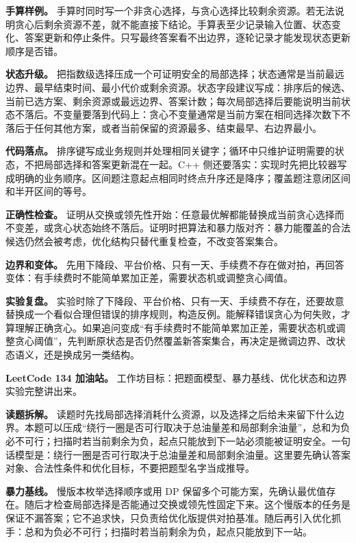 \textbf{手算样例。} 手算时同时写一个非贪心选择，与贪心选择比较剩余资源。若无法说明贪心后剩余资源不差，就不能直接下结论。手算表至少记录输入位置、状态变化、答案更新和停止条件。只写最终答案看不出边界，逐轮记录才能发现状态更新顺序是否错。

\textbf{状态升级。} 把指数级选择压成一个可证明安全的局部选择；状态通常是当前最远边界、最早结束时间、最小代价或剩余资源。状态字段建议写成：排序后的候选、当前已选方案、剩余资源或最远边界、答案计数；每次局部选择后要能说明当前状态不落后。不变量要落到代码上：贪心不变量通常是当前方案在相同选择次数下不落后于任何其他方案，或者当前保留的资源最多、结束最早、右边界最小。

\textbf{代码落点。} 排序键写成业务规则并处理相同关键字；循环中只维护证明需要的状态，不把局部选择和答案更新混在一起。C++ 侧还要落实：实现时先把比较器写成明确的业务顺序。区间题注意起点相同时终点升序还是降序；覆盖题注意闭区间和半开区间的等号。

\textbf{正确性检查。} 证明从交换或领先性开始：任意最优解都能替换成当前贪心选择而不变差，或贪心状态始终不落后。证明时把算法和暴力版对齐：暴力能覆盖的合法候选仍然会被考虑，优化结构只替代重复检查，不改变答案集合。

\textbf{边界和变体。} 先用下降段、平台价格、只有一天、手续费不存在做对拍，再回答变体：有手续费时不能简单累加正差，需要状态机或调整贪心阈值。

\textbf{实验复盘。} 实验时除了下降段、平台价格、只有一天、手续费不存在，还要故意替换成一个看似合理但错误的排序规则，构造反例。能解释错误贪心为何失败，才算理解正确贪心。如果追问变成“有手续费时不能简单累加正差，需要状态机或调整贪心阈值”，先判断原状态是否仍然覆盖新答案集合，再决定是微调边界、改状态语义，还是换成另一类结构。

\noindent\textbf{LeetCode 134 加油站。} 工作坊目标：把题面模型、暴力基线、优化状态和边界实验完整讲出来。

\textbf{读题拆解。} 读题时先找局部选择消耗什么资源，以及选择之后给未来留下什么边界。本题可以压成“绕行一圈是否可行取决于总油量差和局部剩余油量”，总和为负必不可行；扫描时若当前剩余为负，起点只能放到下一站必须能被证明安全。一句话模型是：绕行一圈是否可行取决于总油量差和局部剩余油量。这里要先确认答案对象、合法性条件和优化目标，不要把题型名字当成推导。

\textbf{暴力基线。} 慢版本枚举选择顺序或用 DP 保留多个可能方案，先确认最优值存在。随后才检查局部选择是否能通过交换或领先性固定下来。这个慢版本的任务是保证不漏答案；它不追求快，只负责给优化版提供对拍基准。随后再引入优化抓手：总和为负必不可行；扫描时若当前剩余为负，起点只能放到下一站。

